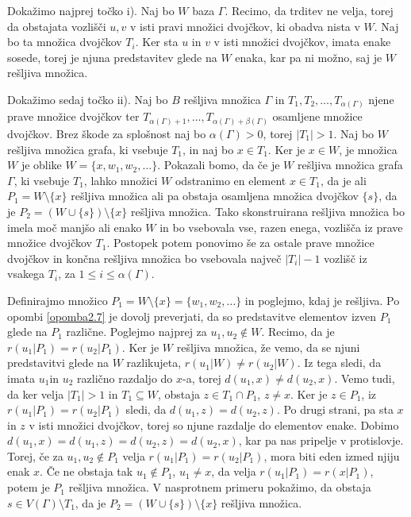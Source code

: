\documentclass[mat1, tisk]{fmfdelo}
\begin{document}
\begin{dokaz}
  Dokažimo najprej točko i). Naj bo $W$ baza $\Gamma$. Recimo, da trditev ne velja, 
  torej da obstajata vozlišči $u,v$ v isti pravi množici dvojčkov, ki obadva nista v $W$. 
  Naj bo ta množica dvojčkov $T_i$. Ker sta $u$ in $v$ v isti množici dvojčkov, 
  imata enake sosede, torej je njuna predstavitev glede na $W$ enaka, kar pa ni 
  možno, saj je $W$ rešljiva množica.

  Dokažimo sedaj točko ii). Naj bo $B$ rešljiva množica $\Gamma$ in 
  $T_1, T_2, \ldots, T_{\alpha(\Gamma)}$ njene prave množice dvojčkov ter 
  $T_{\alpha(\Gamma)+1}, \ldots, T_{\alpha(\Gamma)+\beta(\Gamma)}$ osamljene množice dvojčkov.
  Brez škode za splošnost naj bo $\alpha(\Gamma) > 0$, torej $|T_1| > 1$. 
  Naj bo $W$ rešljiva množica grafa, ki vsebuje $T_1$, in naj bo $x \in T_1$. 
  Ker je $x \in W$, je množica $W$ je oblike $W = \{x, w_1, w_2, \ldots\}$.
  Pokazali bomo, da če je $W$ rešljiva množica grafa $\Gamma$, ki vsebuje $T_1$, lahko 
  množici $W$ odstranimo en element $x \in T_1$, da je ali $P_1 = W \setminus \{x\}$ 
  rešljiva množica ali pa obstaja osamljena množica dvojčkov $\{s\}$, da je 
  $P_2 = (W \cup \{s\}) \setminus \{x\}$ rešljiva množica. Tako skonstruirana rešljiva 
  množica bo imela moč manjšo ali enako $W$ in bo vsebovala vse, razen enega, vozlišča 
  iz prave množice dvojčkov $T_1$. Postopek potem ponovimo še za ostale prave množice dvojčkov 
  in končna rešljiva množica bo vsebovala največ $|T_i| - 1$ vozlišč 
  iz vsakega $T_i$, za $1 \leq i \leq \alpha(\Gamma)$.

  Definirajmo množico $P_1 = W \setminus \{x\} = \{w_1, w_2, \ldots\}$ in poglejmo, kdaj je 
  rešljiva. Po opombi \ref{opomba2.7} je dovolj preverjati, da so predstavitve elementov 
  izven $P_1$ glede na $P_1$ različne. Poglejmo najprej za $u_1, u_2 \notin W$. Recimo, da je 
  $r(u_1|P_1) = r(u_2|P_1)$. Ker je $W$ rešljiva množica, že vemo, da se njuni predstavitvi 
  glede na $W$ razlikujeta, $r(u_1|W) \neq r(u_2|W)$. Iz tega sledi, da imata $u_1$in $u_2$ 
  različno razdaljo do $x$-a, torej $d(u_1, x) \neq d(u_2, x)$. Vemo tudi, da ker velja 
  $|T_1| > 1$ in $T_1 \subseteq W$, obstaja $z \in T_1 \cap P_1$, $z \neq x$. Ker je $z \in P_1$, 
  iz $r(u_1|P_1) = r(u_2|P_1)$ sledi, da $d(u_1, z) = d(u_2, z)$. Po drugi strani, pa 
  sta $x$ in $z$ v isti množici dvojčkov, torej so njune razdalje do elementov enake. 
  Dobimo $d(u_1, x) = d(u_1, z) = d(u_2, z) = d(u_2, x)$, kar pa nas pripelje v 
  protislovje. Torej, če za $u_1, u_2 \notin P_1$ velja $r(u_1|P_1) = r(u_2|P_1)$, 
  mora biti eden izmed njiju enak $x$. Če ne obstaja tak $u_1 \notin P_1$, $u_1 \neq x$, da 
  velja $r(u_1|P_1) = r(x|P_1)$, potem je $P_1$ rešljiva množica. V nasprotnem primeru 
  pokažimo, da obstaja $s \in V(\Gamma) \setminus T_1$,
  da je $P_2 = (W \cup \{s\}) \setminus \{x\}$ rešljiva množica.


\end{dokaz}
\end{document}
